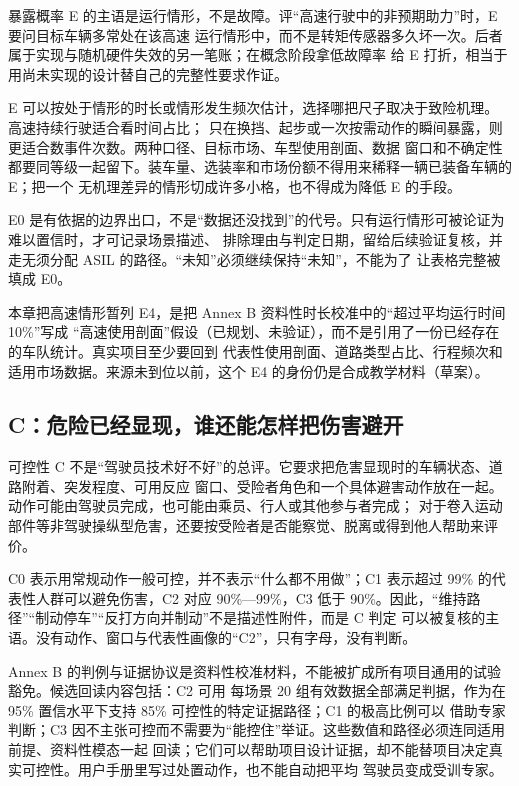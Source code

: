 暴露概率 E 的主语是运行情形，不是故障。评“高速行驶中的非预期助力”时，E 要问目标车辆多常处在该高速
运行情形中，而不是转矩传感器多久坏一次。后者属于实现与随机硬件失效的另一笔账；在概念阶段拿低故障率
给 E 打折，相当于用尚未实现的设计替自己的完整性要求作证。

E 可以按处于情形的时长或情形发生频次估计，选择哪把尺子取决于致险机理。高速持续行驶适合看时间占比；
只在换挡、起步或一次按需动作的瞬间暴露，则更适合数事件次数。两种口径、目标市场、车型使用剖面、数据
窗口和不确定性都要同等级一起留下。装车量、选装率和市场份额不得用来稀释一辆已装备车辆的 E；把一个
无机理差异的情形切成许多小格，也不得成为降低 E 的手段。

E0 是有依据的边界出口，不是“数据还没找到”的代号。只有运行情形可被论证为难以置信时，才可记录场景描述、
排除理由与判定日期，留给后续验证复核，并走无须分配 ASIL 的路径。“未知”必须继续保持“未知”，不能为了
让表格完整被填成 E0。

本章把高速情形暂列 E4，是把 Annex B 资料性时长校准中的“超过平均运行时间 10\%”写成
“高速使用剖面”假设（已规划、未验证），而不是引用了一份已经存在的车队统计。真实项目至少要回到
代表性使用剖面、道路类型占比、行程频次和适用市场数据。来源未到位以前，这个 E4 的身份仍是合成教学材料（草案）。

\subsection{C：危险已经显现，谁还能怎样把伤害避开}

可控性 C 不是“驾驶员技术好不好”的总评。它要求把危害显现时的车辆状态、道路附着、突发程度、可用反应
窗口、受险者角色和一个具体避害动作放在一起。动作可能由驾驶员完成，也可能由乘员、行人或其他参与者完成；
对于卷入运动部件等非驾驶操纵型危害，还要按受险者是否能察觉、脱离或得到他人帮助来评价。

C0 表示用常规动作一般可控，并不表示“什么都不用做”；C1 表示超过 99\% 的代表性人群可以避免伤害，C2
对应 90\%—99\%，C3 低于 90\%。因此，“维持路径”“制动停车”“反打方向并制动”不是描述性附件，而是 C 判定
可以被复核的主语。没有动作、窗口与代表性画像的“C2”，只有字母，没有判断。

Annex B 的判例与证据协议是资料性校准材料，不能被扩成所有项目通用的试验豁免。候选回读内容包括：C2 可用
每场景 20 组有效数据全部满足判据，作为在 95\% 置信水平下支持 85\% 可控性的特定证据路径；C1 的极高比例可以
借助专家判断；C3 因不主张可控而不需要为“能控住”举证。这些数值和路径必须连同适用前提、资料性模态一起
回读；它们可以帮助项目设计证据，却不能替项目决定真实可控性。用户手册里写过处置动作，也不能自动把平均
驾驶员变成受训专家。


